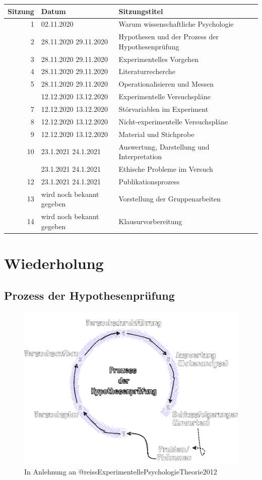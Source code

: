 \documentclass[
]{book}
\begin{document}
\begin{tabular}[t]{rll}
\toprule
Sitzung & Datum & Sitzungstitel\\
\midrule
1 & 02.11.2020 & Warum wissenschaftliche Psychologie\\
2 & 28.11.2020
29.11.2020 & Hypothesen und der Prozess der Hypothesenprüfung\\
3 & 28.11.2020
29.11.2020 & Experimentelles Vorgehen\\
4 & 28.11.2020
29.11.2020 & Literaturrecherche\\
5 & 28.11.2020
29.11.2020 & Operationalisieren und Messen\\
\addlinespace
6 & 12.12.2020
13.12.2020 & Experimentelle Versuchspläne\\
7 & 12.12.2020
13.12.2020 & Störvariablen im Experiment\\
8 & 12.12.2020
13.12.2020 & Nicht-experimentelle Versuchspläne\\
9 & 12.12.2020
13.12.2020 & Material und Stichprobe\\
10 & 23.1.2021
24.1.2021 & Auswertung, Darstellung und Interpretation\\
\addlinespace
11 & 23.1.2021
24.1.2021 & Ethische Probleme im Versuch\\
12 & 23.1.2021
24.1.2021 & Publikationsprozess\\
13 & wird noch bekannt gegeben & Vorstellung der Gruppenarbeiten\\
14 & wird noch bekannt gegeben & Klausurvorbereitung\\
\bottomrule
\end{tabular}

\hypertarget{wiederholung-1}{%
\section{Wiederholung}\label{wiederholung-1}}

\hypertarget{prozess-der-hypothesenpruxfcfung}{%
\subsection{Prozess der Hypothesenprüfung}\label{prozess-der-hypothesenpruxfcfung}}

\begin{figure}

{\centering \includegraphics[width=0.5\linewidth]{imgs/Hypothesen} 

}

\caption{In Anlehnung an @reissExperimentellePsychologieTheorie2012}\label{fig:unnamed-chunk-45}
\end{figure}
\end{document}
